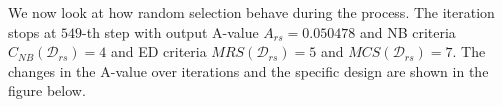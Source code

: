 \documentclass[
  a4paper,
  oneside,
  openany,
  12pt,
  onecolumn]{book}
\theoremstyle{plain}
\theoremstyle{definition}
\theoremstyle{remark}
\begin{document}
We now look at how random selection behave during the process. The
iteration stops at \(549\)-th step with output A-value
\(A_{rs}=0.050478\) and NB criteria \(C_{NB}(\mathcal{D}_{rs})=4\) and
ED criteria \(MRS(\mathcal{D}_{rs})=5\) and \(MCS(\mathcal{D}_{rs})=7\).
The changes in the A-value over iterations and the specific design are
shown in the figure below.

\begin{figure}


\caption{\label{fig-align}}

\end{figure}%
\end{document}
